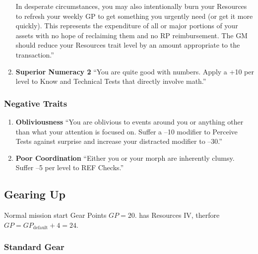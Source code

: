 \begin{enumerate}
    In desperate circumstances, you may also intentionally burn your Resources to refresh your weekly GP to get something you urgently need (or get it more quickly). This represents the expenditure of all or major portions of your assets with no hope of reclaiming them and no RP reimbursement. The GM should reduce your Resources trait level by an amount appropriate to the transaction.” \citep[pg. 76]{ep2e_1.1_2019}

    \item \textbf{\gls{Superior Numeracy} 2} “You are quite good with numbers. Apply a +10 per level to Know and Technical Tests that directly involve math.” \citep[pg. 76]{ep2e_1.1_2019}
\end{enumerate}


\subsubsection{Negative Traits}

\begin{enumerate}
    \item \textbf{\gls{Obliviousness}} “You are oblivious to events around you or anything other than what your attention is focused on. Suffer a –10 modifier to Perceive Tests against surprise and increase your distracted modifier to –30.” \citep[pg. 79]{ep2e_1.1_2019}

    \item \textbf{\gls{Poor Coordination}} “Either you or your morph are inherently clumsy. Suffer –5 per level to REF Checks.” \citep[pg. 79]{ep2e_1.1_2019}
\end{enumerate}


\subsection{Gearing Up}

Normal mission start Gear Points $GP=20$. \texttt{\egr{}}\index{\egr{}} has Resources IV, therfore $GP=GP_{\text{default}}+4=24$.

\subsubsection{Standard Gear}

